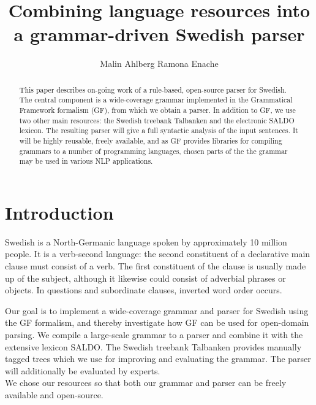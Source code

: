 \documentclass[submission]{eptcs} %
\title{%
        Combining language resources into a grammar-driven Swedish parser}
\author{Malin Ahlberg \qquad\qquad Ramona Enache
\institute{Department of Computer Science \& Engineering, Gothenburg University, Sweden}
}
\begin{document}
\maketitle

\begin{abstract}
This paper describes on-going work of a rule-based, open-source
parser for Swedish. The central component is a wide-coverage grammar
implemented in the Grammatical Framework formalism (GF), from which
we obtain a %
parser.
In addition to GF, we use two other main resources: the Swedish
treebank Talbanken and the electronic SALDO lexicon.
The resulting parser will 
give a full syntactic analysis of the input sentences.
It will be highly reusable, freely available,
and as GF provides libraries for compiling
grammars to a number of programming languages,
chosen parts of the the 
grammar may be used in various NLP applications. %

\end{abstract}

\section{Introduction}
Swedish is a North-Germanic language spoken by approximately 10 million people.
It is a verb-second language: the second constituent of a declarative main
clause must consist of a verb.
The first constituent of the clause is usually made up of the subject,
although it likewise could consist of adverbial phrases or objects.
In questions and subordinate clauses, inverted word order occurs.

Our goal is to implement a wide-coverage grammar and parser for Swedish
using the GF formalism, and 
thereby investigate how GF can be used for open-domain parsing.
We compile a large-scale grammar to a parser
and combine it with the extensive lexicon SALDO. The Swedish treebank 
Talbanken provides manually tagged trees which we use for improving and evaluating
the grammar. The parser will additionally
be evaluated by experts. \\
We chose our resources so that both our grammar and parser can 
be freely available and open-source. 
\end{document}
